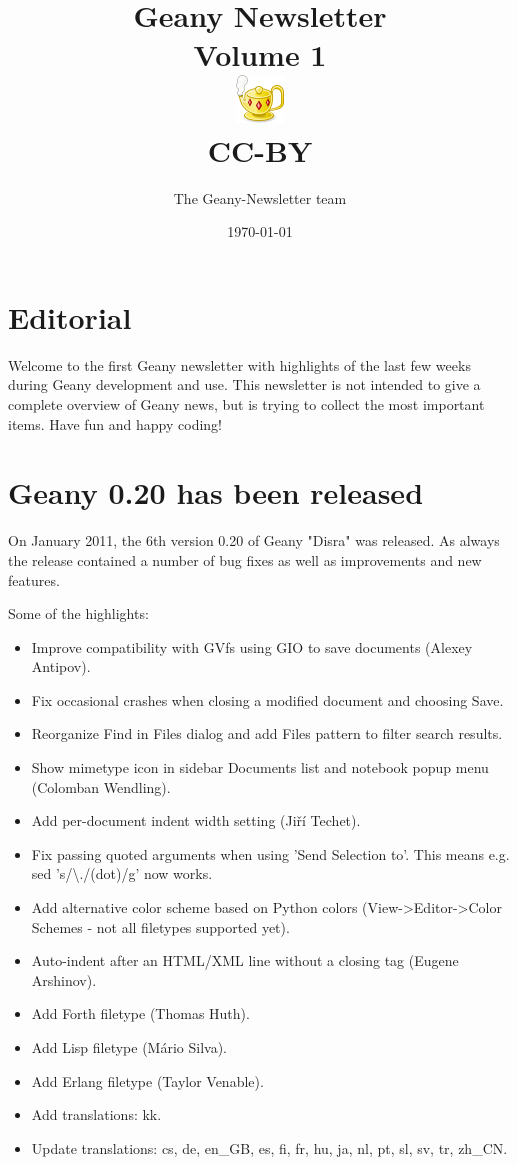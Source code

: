 \documentclass[%
paper=a4,%
fontsize=12pt,%
twoside=false,%
DIV18,
headsepline,
plainheadsepline,
footsepline,
plainfootsepline,
parskip=half,%
openany,%
]{scrartcl}
\title{Geany Newsletter \\[1ex]
	\small{Volume 1} \\[1ex]
	\includegraphics{../img/geany.png} \\[1.5ex]
	CC-BY}
\author{The Geany-Newsletter team}
\date{\today}
\begin{document}
\maketitle{}

\tableofcontents{}

\newpage{}

\section*{Editorial}

Welcome to the first Geany newsletter with highlights of the last few weeks
during Geany development and use. This newsletter is not intended to give a complete
overview of Geany news, but is trying to collect the most important items.
Have fun and happy coding!


\section{Geany 0.20 has been released}

On January 2011, the 6th version 0.20 of Geany "Disra" was released. As always
the release contained a number of bug fixes as well as improvements and new features.

Some of the highlights:

\begin{itemize}
	\item Improve compatibility with GVfs using GIO to save documents (Alexey Antipov).
	\item Fix occasional crashes when closing a modified document and choosing Save.
	\item Reorganize Find in Files dialog and add Files pattern to filter search results.
	\item Show mimetype icon in sidebar Documents list and notebook popup menu (Colomban Wendling).
	\item Add per-document indent width setting (Jiří Techet).
	\item Fix passing quoted arguments when using 'Send Selection to'. This means e.g. sed 's/\textbackslash{}./(dot)/g' now works.
	\item Add alternative color scheme based on Python colors (View->Editor->Color Schemes - not all filetypes supported yet).
	\item Auto-indent after an HTML/XML line without a closing tag (Eugene Arshinov).
	\item Add Forth filetype (Thomas Huth).
	\item Add Lisp filetype (Mário Silva).
	\item Add Erlang filetype (Taylor Venable).
	\item Add translations: kk.
	\item Update translations: cs, de, en\_GB, es, fi, fr, hu, ja, nl, pt, sl, sv, tr, zh\_CN.
\end{itemize}
\end{document}
